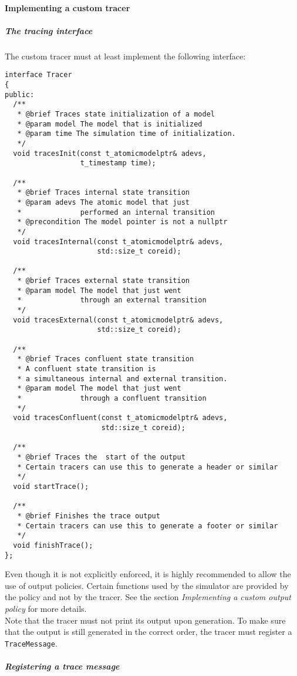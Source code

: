 \paragraph{Implementing a custom tracer}
\subparagraph{The tracing interface}
The custom tracer must at least implement the following interface:
\begin{lstlisting}
interface Tracer
{
public:
  /**
   * @brief Traces state initialization of a model
   * @param model The model that is initialized
   * @param time The simulation time of initialization.
   */
  void tracesInit(const t_atomicmodelptr& adevs,
                  t_timestamp time);

  /**
   * @brief Traces internal state transition
   * @param adevs The atomic model that just
   *              performed an internal transition
   * @precondition The model pointer is not a nullptr
   */
  void tracesInternal(const t_atomicmodelptr& adevs,
                      std::size_t coreid);

  /**
   * @brief Traces external state transition
   * @param model The model that just went
   *              through an external transition
   */
  void tracesExternal(const t_atomicmodelptr& adevs,
                      std::size_t coreid);

  /**
   * @brief Traces confluent state transition
   * A confluent state transition is
   * a simultaneous internal and external transition.
   * @param model The model that just went
   *              through a confluent transition
   */
  void tracesConfluent(const t_atomicmodelptr& adevs,
                       std::size_t coreid);

  /**
   * @brief Traces the  start of the output
   * Certain tracers can use this to generate a header or similar
   */
  void startTrace();
  
  /**
   * @brief Finishes the trace output
   * Certain tracers can use this to generate a footer or similar
   */
  void finishTrace();
};
\end{lstlisting}
Even though it is not explicitly enforced, it is highly recommended to allow the use of output policies. Certain functions used by the simulator are provided by the policy and not by the tracer. See the section \emph{Implementing a custom output policy} for more details.\\
Note that the tracer must not print its output upon generation. To make sure that the output is still generated in the correct order, the tracer must register a \lstinline{TraceMessage}.
\subparagraph{Registering a trace message}
